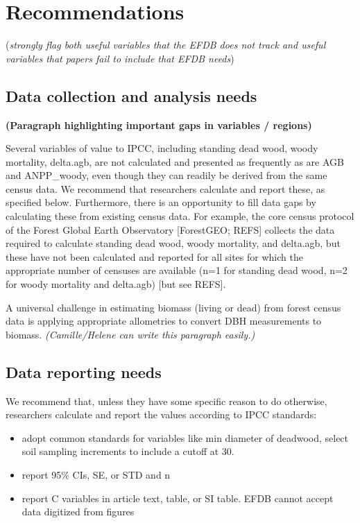 \documentclass[, manuscript]{copernicus}
\begin{document}
\section{Recommendations}

(\emph{strongly flag both useful variables that the EFDB does not track
and useful variables that papers fail to include that EFDB needs})

\subsection{Data collection and analysis needs}

\textbf{(Paragraph highlighting important gaps in variables / regions)}

Several variables of value to IPCC, including standing dead wood, woody
mortality, delta.agb, are not calculated and presented as frequently as
are AGB and ANPP\_woody, even though they can readily be derived from
the same census data. We recommend that researchers calculate and report
these, as specified below. Furthermore, there is an opportunity to fill
data gaps by calculating these from existing census data. For example,
the core census protocol of the Forest Global Earth Observatory
{[}ForestGEO; REFS{]} collects the data required to calculate standing
dead wood, woody mortality, and delta.agb, but these have not been
calculated and reported for all sites for which the appropriate number
of censuses are available (n=1 for standing dead wood, n=2 for woody
mortality and delta.agb) {[}but see REFS{]}.

A universal challenge in estimating biomass (living or dead) from forest
census data is applying appropriate allometries to convert DBH
measurements to biomass. \emph{(Camille/Helene can write this paragraph
easily.)}

\subsection{Data reporting needs}

We recommend that, unless they have some specific reason to do
otherwise, researchers calculate and report the values according to IPCC
standards:

\begin{itemize}
\item
  adopt common standards for variables like min diameter of deadwood,
  select soil sampling increments to include a cutoff at 30.
\item
  report 95\% CIs, SE, or STD and n
\item
  report C variables in article text, table, or SI table. EFDB cannot
  accept data digitized from figures
\end{itemize}
\end{document}
